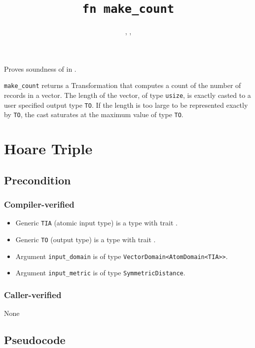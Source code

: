 \documentclass{article}
\title{\texttt{fn make\_count}}
\author{\SilviaCasacubertaAuthor, \GraceTianAuthor, \ConnorWagamanAuthor}
\date{}
\begin{document}
\maketitle

Proves soundness of  in .

\texttt{make\_count} returns a Transformation that computes a count of the number of records in a vector.
The length of the vector, of type \texttt{usize}, is exactly casted to a user specified output type \texttt{TO}.
If the length is too large to be represented exactly by \texttt{TO},
the cast saturates at the maximum value of type \texttt{TO}.

\section{Hoare Triple}
\subsection*{Precondition}

\subsubsection*{Compiler-verified}
\begin{itemize}
    \item Generic \texttt{TIA} (atomic input type) is a type with trait .
    \item Generic \texttt{TO} (output type) is a type with trait .
    \item Argument \texttt{input\_domain} is of type \texttt{VectorDomain<AtomDomain<TIA>{}>}.
    \item Argument \texttt{input\_metric} is of type \texttt{SymmetricDistance}.
\end{itemize}

\subsubsection*{Caller-verified}
None

\subsection*{Pseudocode}

\end{document}
